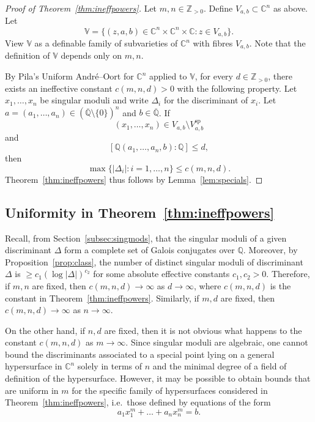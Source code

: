 \documentclass[11pt,a4paper, british]{amsart}
\theoremstyle{definition}
\theoremstyle{remark}
\numberwithin{equation}{section}
\newcommand{\alg}{\overline{\mathbb{Q}}} %
\newcommand{\Q}{\mathbb{Q}} %
\newcommand{\Z}{\mathbb{Z}} %
\newcommand{\C}{\mathbb{C}} %
\begin{document}
\begin{proof}[Proof of Theorem~\ref{thm:ineffpowers}]
Let $m, n \in \Z_{>0}$. Define $V_{a, b} \subset \C^n$ as above. Let
\[ \mathbb{V} = \{ (z, a, b) \in \C^n \times \C^n \times \C : z \in V_{a, b}\}.\]
View $\mathbb{V}$ as a definable family of subvarieties of $\C^n$ with fibres $V_{a, b}$. Note that the definition of $\mathbb{V}$ depends only on $m, n$.

By Pila's Uniform Andr\'e--Oort for $\C^n$ \cite[Theorem~13.2]{Pila11} applied to $\mathbb{V}$, for every $d \in \Z_{>0}$, there exists an ineffective constant $c(m, n, d)>0$ with the following property. Let $x_1, \ldots, x_n$ be singular moduli and write $\Delta_i$ for the discriminant of $x_i$. Let $a = (a_1, \ldots, a_n) \in (\alg \setminus \{0\})^n$ and $b \in \alg$. If
\[ (x_1, \ldots, x_n) \in V_{a, b} \setminus V_{a, b}^\mathrm{sp}\]
and 
\[ [\Q(a_1, \ldots, a_n, b) : \Q] \leq d,\]
then
\[ \max \{ \lvert \Delta_i \rvert : i=1, \ldots, n\} \leq c(m, n, d).\]
Theorem~\ref{thm:ineffpowers} thus follows by Lemma~\ref{lem:specials}.
\end{proof}

\subsection{Uniformity in Theorem~\ref{thm:ineffpowers}}\label{subsec:dep}
	Recall, from Section~\ref{subsec:singmods}, that the singular moduli of a given discriminant $\Delta$ form a complete set of Galois conjugates over $\Q$. Moreover, by Proposition~\ref{prop:class}, the number of distinct singular moduli of discriminant $\Delta$ is $\geq c_1 (\log \lvert \Delta \rvert)^{c_2}$ for some absolute effective constants $c_1, c_2>0$. Therefore, if $m, n$ are fixed, then $c(m, n, d) \to \infty$ as $d \to \infty$, where $c(m, n, d)$ is the constant in Theorem~\ref{thm:ineffpowers}. Similarly, if $m, d$ are fixed, then $c(m, n, d) \to \infty$ as $n \to \infty$.
	
	On the other hand, if $n, d$ are fixed, then it is not obvious what happens to the constant $c(m, n, d)$ as $m \to \infty$. Since singular moduli are algebraic, one cannot bound the discriminants associated to a special point lying on a general hypersurface in $\C^n$ solely in terms of $n$ and the minimal degree of a field of definition of the hypersurface. However, it may be possible to obtain bounds that are uniform in $m$ for the specific family of hypersurfaces considered in Theorem~\ref{thm:ineffpowers}, i.e.~those defined by equations of the form
	\[ a_1 x_1^m + \ldots + a_n x_n^m = b.\]
	
\end{document}
